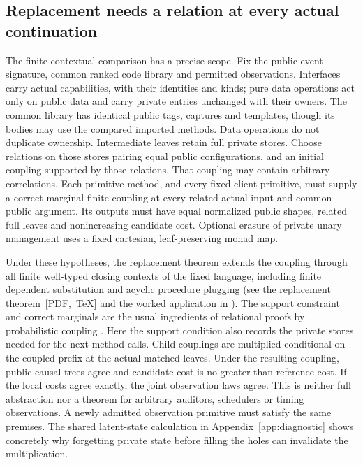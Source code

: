 \documentclass[11pt]{article}
\numberwithin{equation}{section}
\theoremstyle{definition}\newtheorem{definition}[theorem]{Definition}
\begin{document}
\subsection{Replacement needs a relation at every actual continuation}
The finite contextual comparison has a precise scope. Fix the public event
signature, common ranked code library and permitted observations. Interfaces carry
actual capabilities, with their identities and kinds; pure data operations
act only on public data and carry private entries unchanged with their owners.
The common library has identical public tags, captures and templates, though
its bodies may use the compared imported methods. Data operations do not
duplicate ownership. Intermediate leaves retain full private stores.
Choose relations on those stores pairing equal public configurations, and
an initial coupling supported by those relations. That coupling may contain
arbitrary correlations. Each primitive method, and every fixed client
primitive, must supply a correct-marginal finite coupling at every related
actual input and common public argument. Its outputs must have equal
normalized public shapes, related full leaves and nonincreasing candidate
cost. Optional erasure of private unary management uses a fixed cartesian,
leaf-preserving monad map.

Under these hypotheses, the replacement theorem extends the coupling through
all finite well-typed closing contexts of the fixed language, including
finite dependent substitution and acyclic procedure plugging
(see the replacement theorem~\mbox{[\href{https://github.com/eternal-november/eos-research-programmes/blob/10e771644cfdf58c3d05e989e4b26cae7164c80a/projects/contextual-composition/protocols/refinement-recovery/Contextual_Refinement_and_Controlled_Recovery.pdf}{PDF}, \href{https://github.com/eternal-november/eos-research-programmes/blob/10e771644cfdf58c3d05e989e4b26cae7164c80a/projects/contextual-composition/protocols/refinement-recovery/Contextual_Refinement_and_Controlled_Recovery.tex\#L358}{TeX}]} and the worked application
in \cite[Sec.~2]{Casebook}). The support constraint and correct marginals
are the usual ingredients of relational proofs by probabilistic coupling
\cite{barthe}. Here the support condition also records the private stores
needed for the next method calls. Child couplings are multiplied conditional
on the coupled prefix at the actual matched leaves. Under the resulting coupling,
public causal trees agree and candidate cost is no greater than reference cost. If the local costs agree
exactly, the joint observation laws agree. This is neither full abstraction
nor a theorem for arbitrary auditors, schedulers or timing observations.
A newly admitted observation primitive must satisfy the same premises.
The shared latent-state calculation in Appendix~\ref{app:diagnostic}
shows concretely why forgetting private state before filling the holes can
invalidate the multiplication.
\end{document}
